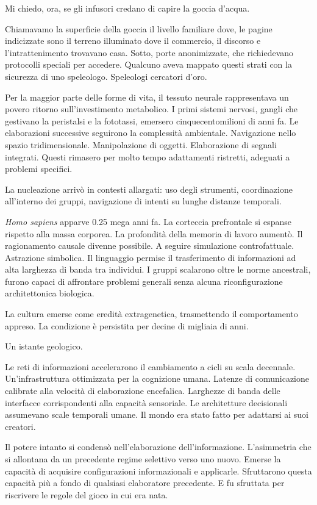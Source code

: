 Mi chiedo, ora, se gli infusori credano di capire la goccia d'acqua.

Chiamavamo la superficie della goccia il livello familiare dove, le pagine indicizzate sono il terreno illuminato dove il commercio, il discorso e l'intrattenimento trovavano casa. Sotto, porte anonimizzate, che richiedevano protocolli speciali per accedere. Qualcuno aveva mappato questi strati con la sicurezza di uno speleologo. Speleologi cercatori d'oro.

Per la maggior parte delle forme di vita, il tessuto neurale rappresentava un povero ritorno sull'investimento metabolico. I primi sistemi nervosi, gangli che gestivano la peristalsi e la fototassi, emersero cinquecentomilioni di anni fa. Le elaborazioni successive seguirono la complessità ambientale. Navigazione nello spazio tridimensionale. Manipolazione di oggetti. Elaborazione di segnali integrati. Questi rimasero per molto tempo adattamenti ristretti, adeguati a problemi specifici. 

La nucleazione arrivò in contesti allargati: uso degli strumenti, coordinazione all'interno dei gruppi, navigazione di intenti su lunghe distanze temporali.

\textit{Homo sapiens} apparve 0.25 mega anni fa. La corteccia prefrontale si espanse rispetto alla massa corporea. La profondità della memoria di lavoro aumentò. Il ragionamento causale divenne possibile. A seguire simulazione controfattuale. Astrazione simbolica. Il linguaggio permise il trasferimento di informazioni ad alta larghezza di banda tra individui. I gruppi scalarono oltre le norme ancestrali, furono capaci di affrontare problemi generali senza alcuna riconfigurazione architettonica biologica.

La cultura emerse come eredità extragenetica, trasmettendo il comportamento appreso. La condizione è persistita per decine di migliaia di anni.

Un istante geologico. 

Le reti di informazioni accelerarono il cambiamento a cicli su scala decennale. Un'infrastruttura ottimizzata per la cognizione umana. Latenze di comunicazione calibrate alla velocità di elaborazione encefalica. Larghezze di banda delle interfacce corrispondenti alla capacità sensoriale. Le architetture decisionali assumevano scale temporali umane. Il mondo era stato fatto per adattarsi ai suoi creatori.

Il potere intanto si condensò nell'elaborazione dell'informazione. L'asimmetria che si allontana da un precedente regime selettivo verso uno nuovo. Emerse la capacità di acquisire configurazioni informazionali e applicarle. Sfruttarono questa capacità più a fondo di qualsiasi elaboratore precedente. E fu sfruttata per riscrivere le regole del gioco in cui era nata.

